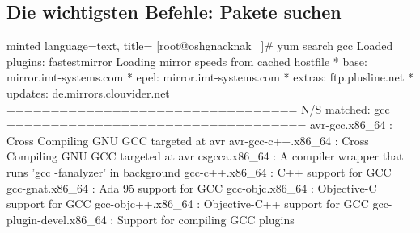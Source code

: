 \documentclass[
    ngerman,
    accentcolor=3b,
    dark_mode,
    fontsize= 12pt,
    a4paper,
    aspectratio=169,
    colorback=true,
    fancy_row_colors,
    leqno,
    fleqn,
    boxarc=3pt,
    fleqn,
]{algoslides}
\begin{document}
    \subsection{Die wichtigsten Befehle: Pakete suchen}
    \begin{frame}[fragile]
        \slidehead{}
        \begin{codeBlock}[fontsize=\tiny]{minted language=text, title=}
            [root@oshgnacknak ~]# yum search gcc
            Loaded plugins: fastestmirror
            Loading mirror speeds from cached hostfile
             * base: mirror.imt-systems.com
             * epel: mirror.imt-systems.com
             * extras: ftp.plusline.net
             * updates: de.mirrors.clouvider.net
            ================================= N/S matched: gcc ==================================
            avr-gcc.x86_64 : Cross Compiling GNU GCC targeted at avr
            avr-gcc-c++.x86_64 : Cross Compiling GNU GCC targeted at avr
            csgcca.x86_64 : A compiler wrapper that runs 'gcc -fanalyzer' in background
            gcc-c++.x86_64 : C++ support for GCC
            gcc-gnat.x86_64 : Ada 95 support for GCC
            gcc-objc.x86_64 : Objective-C support for GCC
            gcc-objc++.x86_64 : Objective-C++ support for GCC
            gcc-plugin-devel.x86_64 : Support for compiling GCC plugins
        \end{codeBlock}
    \end{frame}
\end{document}
